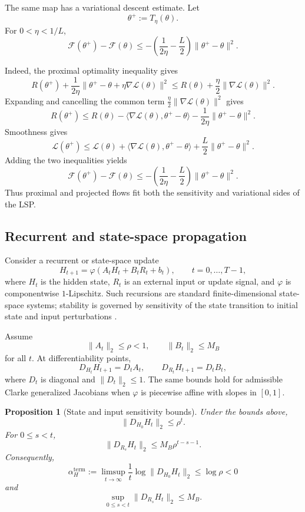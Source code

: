 \documentclass{article}
\newtheorem{proposition}[theorem]{Proposition}
\numberwithin{equation}{section}
\begin{document}
The same map has a variational descent estimate. Let
\[
\theta^+:=T_\eta(\theta).
\]
For \(0<\eta<1/L\),
\[
\mathcal{F}(\theta^+)-\mathcal{F}(\theta)
\le
-\left(\frac{1}{2\eta}-\frac{L}{2}\right)\|\theta^+-\theta\|^2 .
\]

Indeed, the proximal optimality inequality gives
\[
R(\theta^+)
+
\frac{1}{2\eta}
\|\theta^+-\theta+\eta\nabla\mathcal{L}(\theta)\|^2
\le
R(\theta)
+
\frac{\eta}{2}\|\nabla\mathcal{L}(\theta)\|^2 .
\]
Expanding and cancelling the common term
\(\frac{\eta}{2}\|\nabla\mathcal{L}(\theta)\|^2\) gives
\[
R(\theta^+)
\le
R(\theta)
-
\langle\nabla\mathcal{L}(\theta),\theta^+-\theta\rangle
-
\frac{1}{2\eta}\|\theta^+-\theta\|^2 .
\]
Smoothness gives
\[
\mathcal{L}(\theta^+)
\le
\mathcal{L}(\theta)
+
\langle\nabla\mathcal{L}(\theta),\theta^+-\theta\rangle
+
\frac{L}{2}\|\theta^+-\theta\|^2 .
\]
Adding the two inequalities yields
\[
\mathcal{F}(\theta^+)-\mathcal{F}(\theta)
\le
-\left(\frac{1}{2\eta}-\frac{L}{2}\right)\|\theta^+-\theta\|^2 .
\]
Thus proximal and projected flows fit both the sensitivity and variational sides of the LSP.

\subsection{Recurrent and state-space propagation}
\label{subsec:recurrent-state-space-example}

Consider a recurrent or state-space update
\[
H_{t+1}
=
\varphi(A_tH_t+B_tR_t+b_t),
\qquad
t=0,\ldots,T-1,
\]
where \(H_t\) is the hidden state, \(R_t\) is an external input or update signal, and \(\varphi\) is componentwise \(1\)-Lipschitz. Such recursions are standard finite-dimensional state-space systems; stability is governed by sensitivity of the state transition to initial state and input perturbations
\cite{Sontag1998,Khalil2002Nonlinear}.

Assume
\[
\|A_t\|_2\le\rho<1,
\qquad
\|B_t\|_2\le M_B
\]
for all \(t\). At differentiability points,
\[
D_{H_t}H_{t+1}
=
D_tA_t,
\qquad
D_{R_t}H_{t+1}
=
D_tB_t,
\]
where \(D_t\) is diagonal and \(\|D_t\|_2\le1\). The same bounds hold for admissible Clarke generalized Jacobians when \(\varphi\) is piecewise affine with slopes in \([0,1]\).

\begin{proposition}[State and input sensitivity bounds]
\label{prop:state-space-sensitivity-bound}
Under the bounds above,
\[
\|D_{H_0}H_t\|_2
\le
\rho^t .
\]
For \(0\le s<t\),
\[
\|D_{R_s}H_t\|_2
\le
M_B\rho^{t-s-1}.
\]
Consequently,
\[
\alpha_H^{\mathrm{term}}
:=
\limsup_{t\to\infty}
\frac1t\log\|D_{H_0}H_t\|_2
\le
\log\rho<0
\]
and
\[
\sup_{0\le s<t}\|D_{R_s}H_t\|_2
\le
M_B .
\]
\end{proposition}
\end{document}
